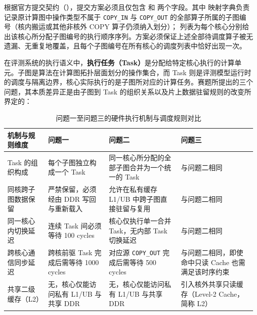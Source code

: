 \documentclass[anonymous,withtoc]{gmcm2026}
\begin{document}
根据官方提交契约（\texttt{}），提交方案必须且仅包含 \texttt{} 和 \texttt{} 两个字段。其中 \texttt{} 映射字典负责记录原计算图中操作类型不属于 \texttt{COPY\_IN} 与 \texttt{COPY\_OUT} 的全部算子所属的子图编号（核内搬运或其他非核外 COPY 算子仍须纳入划分）；\texttt{} 列表为每个核心分别给出该核心所分配子图编号的执行顺序序列。方案必须保证上述全部待调度算子被无遗漏、无重复地覆盖，且每个子图编号在所有核心的调度列表中恰好出现一次。

在评测系统的执行语义中，\textbf{执行任务（Task）}是分配给特定核心执行的计算单元。子图是算法在计算图拓扑层面划分的操作集合，而 Task 则是评测模型运行时的调度与隔离边界，核心实际执行的是子图所对应的计算任务。赛题所提出的三个问题，其本质差异正是由子图到 Task 的组织关系以及片上数据驻留规则的改变所界定的：



{\def\LTcaptype{table} %
\begin{table}[!htbp]\centering
\caption{问题一至问题三的硬件执行机制与调度规则对比}\label{tab:01-problem-1}\normalsize
\begin{tabular}{@{}
  >{\raggedright\arraybackslash}p{}
  >{\raggedright\arraybackslash}p{}
  >{\raggedright\arraybackslash}p{}
  >{\raggedright\arraybackslash}p{}@{}}
\toprule\noalign{}
\begin{minipage}[b]{\linewidth}\raggedright
机制与规则维度
\end{minipage} & \begin{minipage}[b]{\linewidth}\raggedright
问题一
\end{minipage} & \begin{minipage}[b]{\linewidth}\raggedright
问题二
\end{minipage} & \begin{minipage}[b]{\linewidth}\raggedright
问题三
\end{minipage} \\
\midrule\noalign{}


Task 的组织构成 & 每个子图独立构成一个 Task & 同一核心所分配的全部子图合并为一个统一的 Task & 与问题二相同 \\
同核跨子图数据保留 & 严禁保留，必须经由 DDR 写回与重新载入 & 允许在私有缓存 L1/UB 中跨子图直接驻留与复用 & 与问题二相同 \\
同一核心内切换延迟 & 连续 Task 间必须等待 100 cycles & 核心仅执行单一合并 Task，无内部 Task 切换延迟 & 与问题二相同 \\
跨核心通信同步延迟 & 跨核前驱 Task 完成后需等待 1000 cycles & 对应源 \texttt{COPY\_OUT} 完成后需等待 500 cycles & 与问题二相同，即使命中只读 Cache 也需满足该时序约束 \\
共享二级缓存（L2） & 无，核心仅能访问私有 L1/UB 与共享 DDR & 无，核心仅能访问私有 L1/UB 与共享 DDR & 引入核外共享只读缓存（Level-2 Cache，简称 L2） \\
\bottomrule\end{tabular}
\end{table}
}
\end{document}
